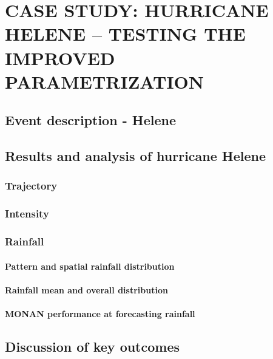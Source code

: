 \chapter{CASE STUDY: HURRICANE HELENE – TESTING THE IMPROVED PARAMETRIZATION}
\label{ch:hurricanes}

\section{Event description - Helene}

\section{Results and analysis of hurricane Helene}

\subsection{Trajectory}

\subsection{Intensity}

\subsection{Rainfall}

\subsubsection{Pattern and spatial rainfall distribution}

\subsubsection{Rainfall mean and overall distribution}

\subsubsection{MONAN performance at forecasting rainfall}

\section{Discussion of key outcomes}

